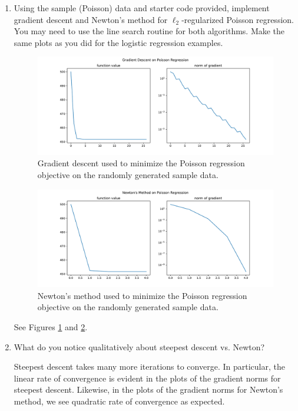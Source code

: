 \documentclass[11pt]{amsart}
\begin{document}
\begin{enumerate}
\begin{enumerate}
\item Using the sample (Poisson) data  and starter code provided, implement gradient descent and Newton's method for $\ell_2$-regularized Poisson regression. You may need to use the line search routine for 
  both algorithms. Make the same plots as you did for the logistic regression examples.

  \begin{figure}
  \centering
  \includegraphics[width=\textwidth]{poisson_gradient_descent.pdf}
  \caption{Gradient descent used to minimize the Poisson regression objective on
    the randomly generated sample data.}
  \label{fig:poisson_gradient_descent}
\end{figure}

\begin{figure}
  \centering
  \includegraphics[width=\textwidth]{poisson_newton.pdf}
  \caption{Newton's method used to minimize the Poisson regression objective on
    the randomly generated sample data.}
  \label{fig:poisson_newton}
\end{figure}

See Figures \ref{fig:poisson_gradient_descent} and \ref{fig:poisson_newton}.
  
\item What do you notice qualitatively about steepest descent vs. Newton?

  Steepest descent takes many more iterations to converge. In particular, the
  linear rate of convergence is evident in the plots of the gradient norms for
  steepest descent. Likewise, in the plots of the gradient norms for Newton's
  method, we see quadratic rate of convergence as expected. 
\end{enumerate}

\bigskip\bigskip




\end{enumerate}
\end{document}
